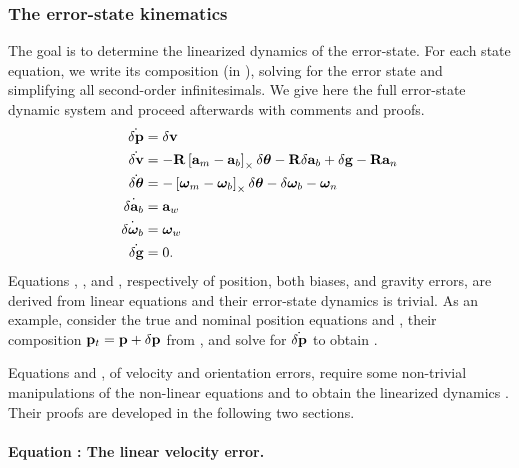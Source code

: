 \subsubsection{The error-state kinematics}

The goal is to determine the linearized dynamics of the error-state. 
For each state equation, we write its composition (in ), solving for the error state and simplifying all second-order infinitesimals. 
We give here the full error-state dynamic system and proceed afterwards with comments and proofs.
%
\begin{subequations}\label{equ:efull}
%
\begin{align}
\dot{\delta{\bf p}} &= \delta{\bf v} \label{equ:epos}\\
\dot{\delta{\bf v}} &= -{\bf R}\left[{\bf a}_m-{\bf a}_b\right]_\times\delta{\bm \theta} - {\bf R}\delta{\bf a}_b + \delta{\bf g} - {\bf R}{\bf a}_n \label{equ:evel}\\
\dot{\delta{\bm \theta}} &= -\left[{\bm \omega}_m-{\bm \omega}_b\right]_\times\delta{\bm \theta} - \delta{\bm \omega}_b - {\bm \omega}_n \label{equ:equat}\\
\dot{\delta{\bf a}_b} &= {\bf a}_w \label{equ:eabias}\\
\dot{\delta{\bm \omega}_b} &= {\bm \omega}_w \label{equ:ewbias}\\
\dot{\delta{\bf g}} &= 0 .\label{equ:egrav}
\end{align}%
\end{subequations}
%
Equations , ,  and , respectively of position, both biases, and gravity errors, are derived from linear equations and their error-state dynamics is trivial. 
As an example, consider the true and nominal position equations  and , their composition ${\bf p}_t={\bf p}+\delta{\bf p}$ from , and solve for $\dot{\delta {\bf p}}$ to obtain .

Equations  and , of velocity and orientation errors, require some non-trivial manipulations of the non-linear equations  and  to obtain the linearized dynamics%
. 
Their proofs are developed in the following two sections.


\paragraph{Equation : The linear velocity error.}

